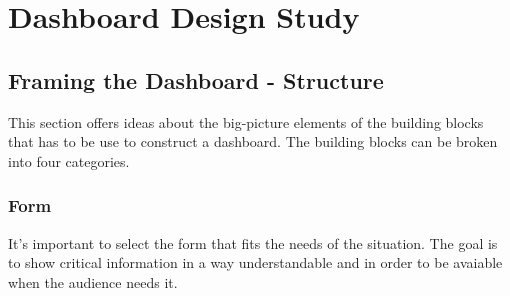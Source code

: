 \documentclass[a4paper,12pt]{report}
\begin{document}
\chapter{Dashboard Design Study}
\section{Framing the Dashboard - Structure}
This section offers ideas about the big-picture elements of the building blocks that has to be use to construct a dashboard. The building blocks can be broken into four categories.
\subsection{Form}
It's important to select the form that fits the needs of the situation.
The goal is to show critical information in a way understandable and in order to be avaiable when the audience needs it.
\end{document}
